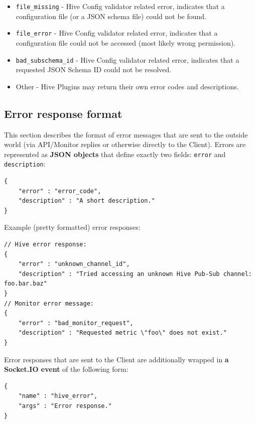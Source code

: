\documentclass[a4paper]{article}
\begin{document}
\begin{itemize}
\item \texttt{file\_missing} - Hive Config validator related error, indicates that a configuration file (or a JSON schema file) could not be found.
\item \texttt{file\_error} - Hive Config validator related error, indicates that a configuration file could not be accessed (most likely wrong permission).
\item \texttt{bad\_subschema\_id} - Hive Config validator related error, indicates that a requested JSON Schema ID could not be resolved.
\item Other - Hive Plugins may return their own error codes and descriptions.
\end{itemize}
\subsection{Error response format}
\label{sec-5-4}
\label{ref-error_format}

This section describes the format of error messages that are sent to the outside world (via API/Monitor replies or otherwise directly to the Client). Errors are represented as \textbf{JSON objects} that define exactly two fields: \texttt{error} and \texttt{description}:


\begin{verbatim}
{
    "error" : "error_code",
    "description" : "A short description."
}
\end{verbatim}




\noindent
Example (pretty formatted) error responses:


\begin{verbatim}
// Hive error response:
{
    "error" : "unknown_channel_id",
    "description" : "Tried accessing an unknown Hive Pub-Sub channel: foo.bar.baz"
}
// Monitor error message:
{
    "error" : "bad_monitor_request",
    "description" : "Requested metric \"foo\" does not exist."
}
\end{verbatim}




\noindent
Error responses that are sent to the Client are additionally wrapped in \textbf{a Socket.IO event} of the following form:


\begin{verbatim}
{
    "name" : "hive_error",
    "args" : "Error response."
}
\end{verbatim}
\end{document}
